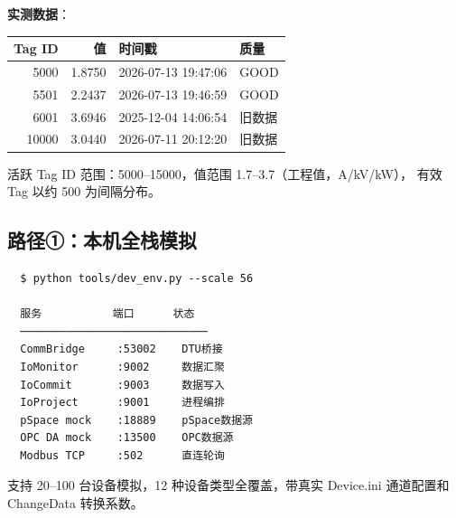 \documentclass[12pt,a4paper]{ctexart}
\begin{document}
\textbf{实测数据}：
\begin{table}[H]\centering
\begin{tabular}{rrll}
\toprule
\textbf{Tag ID} & \textbf{值} & \textbf{时间戳} & \textbf{质量} \\
\midrule
5000 & 1.8750 & 2026-07-13 19:47:06 & GOOD \\
5501 & 2.2437 & 2026-07-13 19:46:59 & GOOD \\
6001 & 3.6946 & 2025-12-04 14:06:54 & 旧数据 \\
10000 & 3.0440 & 2026-07-11 20:12:20 & 旧数据 \\
\bottomrule
\end{tabular}
\end{table}

活跃 Tag ID 范围：5000--15000，值范围 1.7--3.7（工程值，A/kV/kW），
有效 Tag 以约 500 为间隔分布。

\subsection{路径①：本机全栈模拟}
\begin{verbatim}
  $ python tools/dev_env.py --scale 56

  服务           端口      状态
  ─────────────────────────────
  CommBridge     :53002    DTU桥接
  IoMonitor      :9002     数据汇聚
  IoCommit       :9003     数据写入
  IoProject      :9001     进程编排
  pSpace mock    :18889    pSpace数据源
  OPC DA mock    :13500    OPC数据源
  Modbus TCP     :502      直连轮询
\end{verbatim}

支持 20--100 台设备模拟，12 种设备类型全覆盖，带真实 Device.ini
通道配置和 ChangeData 转换系数。
\end{document}
